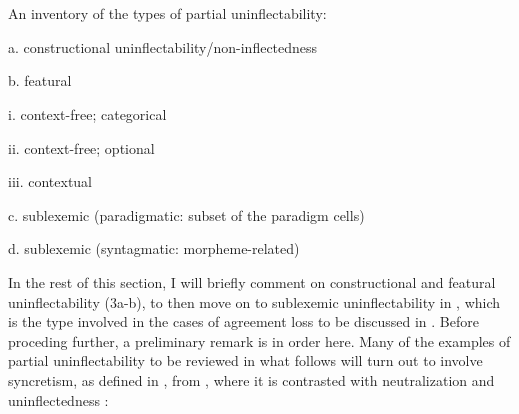\documentclass[output=paper]{langscibook}
\begin{document}
\begin{styleTabellaLUNGA}
\ea%
    \label{ex:key:3}
    \gll \\
         \\
    \glt
    \z %

          An inventory of the types of partial uninflectability:
\end{styleTabellaLUNGA}

\begin{styleTabellaLUNGA}
  a.  constructional uninflectability/non-inflectedness \citep[144]{Spencer2020}
\end{styleTabellaLUNGA}

\begin{styleTabellaLUNGA}
  b.  featural
\end{styleTabellaLUNGA}

\begin{styleTabellaLUNGA}
    i.  context-free; categorical
\end{styleTabellaLUNGA}

\begin{styleTabellaLUNGA}
    ii.  context-free; optional
\end{styleTabellaLUNGA}

\begin{styleTabellaLUNGA}
    iii.  contextual
\end{styleTabellaLUNGA}

\begin{styleTabellaLUNGA}
  c.  sublexemic (paradigmatic: subset of the paradigm cells)
\end{styleTabellaLUNGA}

\begin{styleTabellaLUNGA}
  d.  sublexemic (syntagmatic: morpheme-related)
\end{styleTabellaLUNGA}

In the rest of this section, I will briefly comment on constructional and featural uninflectability (3a-b), to then move on to sublexemic uninflectability in , which is the type involved in the cases of agreement loss to be discussed in . Before proceding further, a preliminary remark is in order here. Many of the examples of partial uninflectability to be reviewed in what follows will turn out to involve syncretism, as defined in , from \citet{BaermanEtAl2005}, where it is contrasted with neutralization and uninflectedness :
\end{document}
